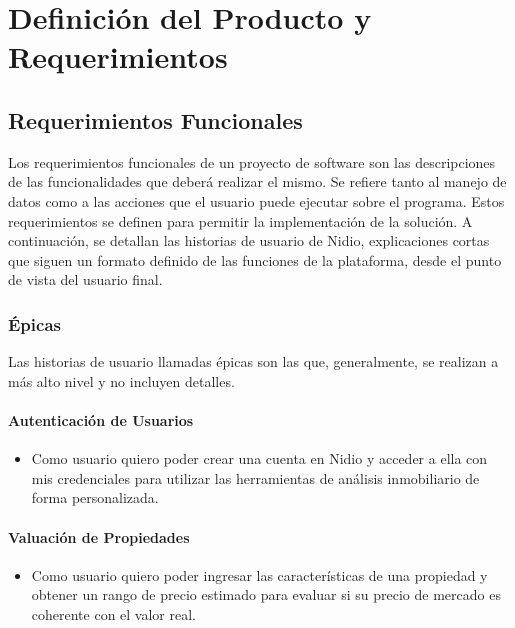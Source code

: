 \chapter{Definición del Producto y Requerimientos}

\section{Requerimientos Funcionales}

Los requerimientos funcionales de un proyecto de software son las descripciones de las funcionalidades que deberá realizar el mismo. Se refiere tanto al manejo de datos como a las acciones que el usuario puede ejecutar sobre el programa. Estos requerimientos se definen para permitir la implementación de la solución. A continuación, se detallan las historias de usuario de Nidio, explicaciones cortas que siguen un formato definido de las funciones de la plataforma, desde el punto de vista del usuario final.

\subsection{Épicas}

Las historias de usuario llamadas épicas son las que, generalmente, se realizan a más alto nivel y no incluyen detalles.

\subsubsection{Autenticación de Usuarios}

\begin{itemize}
\item Como usuario quiero poder crear una cuenta en Nidio y acceder a ella con mis credenciales para utilizar las herramientas de análisis inmobiliario de forma personalizada.
\end{itemize}

\subsubsection{Valuación de Propiedades}

\begin{itemize}
\item Como usuario quiero poder ingresar las características de una propiedad y obtener un rango de precio estimado para evaluar si su precio de mercado es coherente con el valor real.
\end{itemize}

